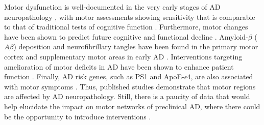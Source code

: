 \documentclass[review,3p,times,12pt,letterpaper]{elsarticle}
\begin{document}
Motor dysfunction is well-documented in the very early stages of AD neuropathology \cite{camicioli_motor_1998,watson_executive_2010}, with motor assessments showing sensitivity that is comparable to that of traditional tests of cognitive function \cite{kluger_patterns_1997,rycroft_relationship_2019}. Furthermore, motor changes have been shown to predict future cognitive and functional decline \cite{wilson_parkinsonianlike_2003,buchman_grip_2007}. Amyloid-$\beta$ ($A\beta$) deposition and neurofibrillary tangles have been found in the primary motor cortex and supplementary motor areas in early AD \cite{arnold_topographical_1991}. Interventions targeting amelioration of motor deficits in AD have been shown to enhance patient function \cite{scarmeas_motor_2005,smallfield_effectiveness_2017}. Finally, AD risk genes, such as PS1 and ApoE-$\epsilon4$, are also associated with motor symptoms \cite{lazarov_impairments_2007,buchman_apolipoprotein_2009}. Thus, published studies demonstrate that motor regions are affected by AD neuropathology. Still, there is a paucity of data that would help elucidate the impact on motor networks of preclinical AD, where there could be the opportunity to introduce interventions \cite{buchman2011loss}.
\end{document}
